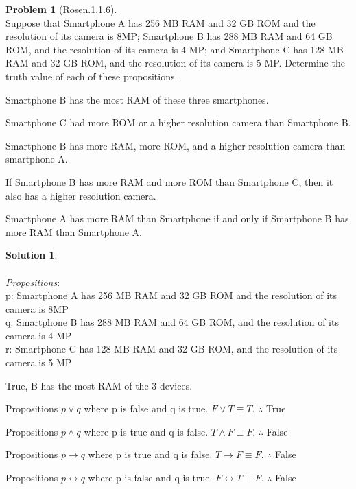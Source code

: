 \documentclass{article}
\theoremstyle{definition}
\newtheorem*{problem}{Problem}
\newtheorem*{solution}{Solution}
\begin{document}
\begin{problem}[Rosen.1.1.6]\ \\
Suppose that Smartphone A has 256 MB RAM and 32 GB ROM and the resolution of its camera is 8MP; Smartphone B has 288 MB RAM and 64 GB ROM, and the resolution of its camera is 4 MP; and Smartphone C has 128 MB RAM and 32 GB ROM, and the resolution of its camera is 5 MP. Determine the truth value of each of these propositions.
\ \\
\begin{compactenum}
\renewcommand{\theenumi}{\alph{enumi}}

\item Smartphone B has the most RAM of these three smartphones.
\item Smartphone C had more ROM or a higher resolution camera than Smartphone B.
\item Smartphone B has more RAM, more ROM, and a higher resolution camera than smartphone A.
\item If Smartphone B has more RAM and more ROM than Smartphone C, then it also has a higher resolution camera.
\item Smartphone A has more RAM than Smartphone  if and only if Smartphone B has more RAM than Smartphone A.
\end{compactenum}
\end{problem}

\begin{solution}\ \\
\ \\
\noindent 
\textit{Propositions}:\ \\
p: Smartphone A has 256 MB RAM and 32 GB ROM and the resolution of its camera is 8MP\ \\
q: Smartphone B has 288 MB RAM and 64 GB ROM, and the resolution of its camera is 4 MP\ \\
r: Smartphone C has 128 MB RAM and 32 GB ROM, and the resolution of its camera is 5 MP\ \\
\begin{compactenum}
\renewcommand{\theenumi}{\alph{enumi}}
\item True, B has the most RAM of the 3 devices.
\item Propositions $p \vee q$ where p is false and q is true. $F \vee T \equiv T$. $\therefore$ True
\item Propositions $p \wedge q$ where p is true and q is false. $T \wedge F \equiv F$. $\therefore$ False
\item Propositions $p \xrightarrow{} q$ where p is true and q is false. $T \xrightarrow{} F \equiv F$. $\therefore$ False
\item Propositions $p \leftrightarrow q$ where p is false and q is true. $F \leftrightarrow T \equiv F$. $\therefore$ False
\end{compactenum}
\end{solution}
\end{document}
